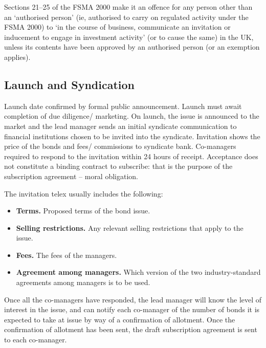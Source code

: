 \documentclass[
]{article}
\newenvironment{Shaded}{}{}
\newcommand{\NormalTok}[1]{#1}
\providecommand{\tightlist}{%
  \setlength{\itemsep}{0pt}\setlength{\parskip}{0pt}}
\begin{document}
\begin{Shaded}
\begin{Highlighting}[]
\NormalTok{Sections 21–25 of the FSMA 2000 make it an offence for any person other than an ‘authorised person’ (ie, authorised to carry on regulated activity under the FSMA 2000) to ‘in the course of business, communicate an invitation or inducement to engage in investment activity’ (or to cause the same) in the UK, unless its contents have been approved by an authorised person (or an exemption applies).}
\end{Highlighting}
\end{Shaded}

\hypertarget{launch-and-syndication}{%
\subsection{Launch and Syndication}\label{launch-and-syndication}}

Launch date confirmed by formal public announcement. Launch must await
completion of due diligence/ marketing. On launch, the issue is
announced to the market and the lead manager sends an initial syndicate
communication to financial institutions chosen to be invited into the
syndicate. Invitation shows the price of the bonds and fees/ commissions
to syndicate bank. Co-managers required to respond to the invitation
within 24 hours of receipt. Acceptance does not constitute a binding
contract to subscribe: that is the purpose of the subscription agreement
-- moral obligation.

The invitation telex usually includes the following:

\begin{itemize}
\tightlist
\item
  \textbf{Terms.} Proposed terms of the bond issue.
\item
  \textbf{Selling restrictions.} Any relevant selling restrictions that
  apply to the issue.
\item
  \textbf{Fees.} The fees of the managers.
\item
  \textbf{Agreement among managers.} Which version of the two
  industry-standard agreements among managers is to be used.
\end{itemize}

Once all the co-managers have responded, the lead manager will know the
level of interest in the issue, and can notify each co-manager of the
number of bonds it is expected to take at issue by way of a confirmation
of allotment. Once the confirmation of allotment has been sent, the
draft subscription agreement is sent to each co-manager.
\end{document}
